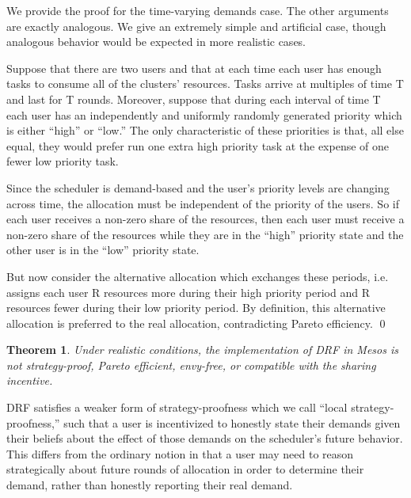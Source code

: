 \documentclass{acm_proc_article-sp}
\newtheorem{theorem}{Theorem}[section]
\newenvironment{pproof}[1][Proof]{\begin{trivlist}
\item[\hskip \labelsep {\bfseries #1}]}{\end{trivlist}}
\begin{document}
\begin{pproof}
We provide the proof for the time-varying demands case. The other arguments are exactly analogous. We give an extremely simple and artificial case, though analogous behavior would be expected in more realistic cases.

Suppose that there are two users and that at each time each user has enough tasks to consume all of the clusters' resources. Tasks arrive at multiples of time T and last for T rounds. Moreover, suppose that during each interval of time T each user has an independently and uniformly randomly generated priority which is either ``high'' or ``low.'' The only characteristic of these priorities is that, all else equal, they would prefer run one extra high priority task at the expense of one fewer low priority task.

Since the scheduler is demand-based and the user's priority levels are changing across time, the allocation must be independent of the priority of the users. So if each user receives a non-zero share of the resources, then each user must receive a non-zero share of the resources while they are in the ``high'' priority state and the other user is in the ``low'' priority state. 

But now consider the alternative allocation which exchanges these periods, i.e. assigns each user R resources more during their high priority period and R resources fewer during their low priority period. By definition, this alternative allocation is preferred to the real allocation, contradicting Pareto efficiency.
\qed
\end{pproof}

\begin{theorem}
Under realistic conditions, the implementation of DRF in Mesos is not strategy-proof, Pareto efficient, envy-free, or compatible with the sharing incentive. 
\end{theorem}

DRF satisfies a weaker form of strategy-proofness which we call ``local strategy-proofness,'' 
such that a user is incentivized to honestly state their demands given their beliefs about the effect of those demands on the scheduler's future behavior. 
This differs from the ordinary notion in that a user may need to reason strategically about future rounds of allocation in order to determine
their demand, rather than honestly reporting their real demand.
\end{document}
